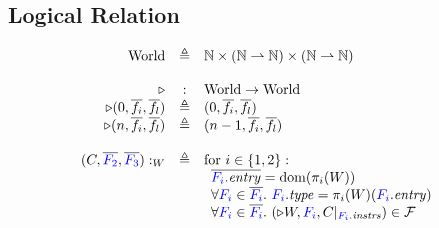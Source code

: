 \subsection{Logical Relation}
\label{appendix:lr}

\begin{center}
\end{center}

\[\begin{array}{rcl}
  \mathrm{World} & \triangleq & \mathbb{N} \times (\mathbb{N} \rightharpoonup \mathbb{N}) \times (\mathbb{N} \rightharpoonup \mathbb{N}) \\
  \\
  \mathord{\triangleright} & : & \mathrm{World} \rightarrow \mathrm{World} \\
  \mathord{\triangleright} (0, \overline{f_i}, \overline{f_l}) & \triangleq & (0, \overline{f_i}, \overline{f_l}) \\
  \mathord{\triangleright} (n, \overline{f_i}, \overline{f_l}) & \triangleq & (n - 1, \overline{f_i}, \overline{f_l}) \\
  \\
  (C, \overline{{\color{blue}{F_2}}}, \overline{{\color{blue}{F_3}}}) :_W & \triangleq & \text{for } i \in \{1, 2\}: \\
  & &
  \begin{array}[t]{l}
    \overline{{\color{blue}{F_i}}.\mathit{entry}} = \operatorname{dom}({\pi_i(W)}) \\
    \forall {\color{blue}{F_i}} \in \overline{{\color{blue}{F_i}}}.~ {\color{blue}{F_i}}.\mathit{type} = \pi_i(W)({\color{blue}{F_i}}.\mathit{entry}) \\
    \forall {\color{blue}{F_i}} \in \overline{{\color{blue}{F_i}}}.~ (\mathord{\triangleright} W, {\color{blue}{F_i}}, C|_{{\color{blue}{F_i}}.\mathit{instrs}}) \in \mathcal{F}
  \end{array}
\end{array}\]

